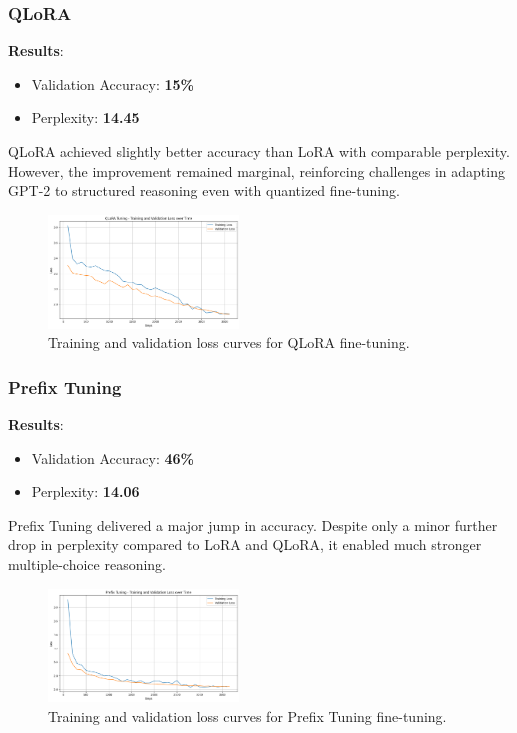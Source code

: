 \documentclass[11pt,twocolumn]{article}
\begin{document}
\subsubsection{QLoRA}
\textbf{Results}:
\begin{itemize}
    \item Validation Accuracy: \textbf{15\%}
    \item Perplexity: \textbf{14.45}
\end{itemize}

QLoRA achieved slightly better accuracy than LoRA with comparable perplexity. However, the improvement remained marginal, reinforcing challenges in adapting GPT-2 to structured reasoning even with quantized fine-tuning.
\begin{figure}[h]
\centering
\includegraphics[width=0.45\textwidth]{../graphs/QLoRA.png}
\caption{Training and validation loss curves for QLoRA fine-tuning.}
\label{fig:qlora-loss}
\end{figure}

\subsubsection{Prefix Tuning}
\textbf{Results}:
\begin{itemize}
    \item Validation Accuracy: \textbf{46\%}
    \item Perplexity: \textbf{14.06}
\end{itemize}

Prefix Tuning delivered a major jump in accuracy. Despite only a minor further drop in perplexity compared to LoRA and QLoRA, it enabled much stronger multiple-choice reasoning.
\begin{figure}[h]
\centering
\includegraphics[width=0.45\textwidth]{../graphs/Prefix.png}
\caption{Training and validation loss curves for Prefix Tuning fine-tuning.}
\label{fig:prefix-loss}
\end{figure}
\end{document}
